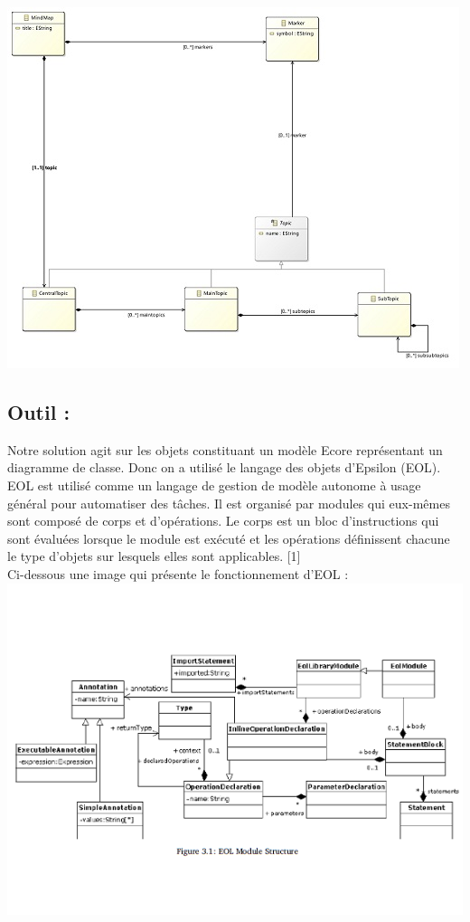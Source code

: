 \documentclass[french]{article}
\begin{document}
\includegraphics{images/MindMap.jpg}	
\newpage
\subsection{Outil :}

	\hspace{10 mm} Notre solution agit sur les objets constituant un modèle Ecore représentant un diagramme de classe. Donc on a utilisé le langage des objets d'Epsilon (EOL). EOL est utilisé comme un langage de gestion de modèle autonome à usage général pour automatiser des tâches. Il est organisé par modules qui eux-mêmes sont composé de corps et d'opérations. Le corps est un bloc d'instructions qui sont évaluées lorsque le module est exécuté et les opérations définissent chacune le type d'objets sur lesquels elles sont applicables. [1]\\
	
Ci-dessous une image qui présente le fonctionnement d'EOL :
\flushleft\includegraphics{images/eol.png}
\end{document}

